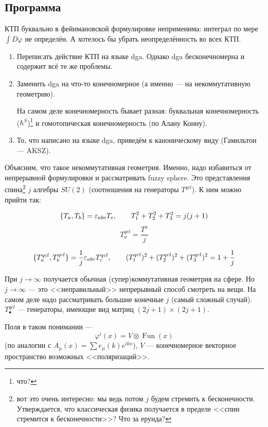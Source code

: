 \documentclass[11pt]{article}
\def\ph{\varphi}
\theoremstyle{remark}
\theoremstyle{definition}
\newcommand{\que}[1]{\footnote{\textcolor[rgb]{0.38,0.69,0.82}{#1}}}
\begin{document}
\subsection{Программа}

КТП буквально в фейнмановской формулировке неприменима: интеграл по мере $\int D\ph$ не определён. А хотелось бы убрать неопределённость во всех КТП.

\begin{enumerate}

\item Переписать действие КТП на языке dga. Однако dga бесконечномерна и содержит всё те же проблемы.
\item Заменить dga на что-то конечномерное (а именно --- на некоммутативную геометрию).

На самом деле конечномерность бывает разная: буквальная конечномерность ($\hbar^S$)\que{что?} и гомотопическая конечномерность (по Алану Конну).

\item То, что написано на языке dga, приведём к каноническому виду (Гамильтон --- AKSZ).

\end{enumerate}

Объясним, что такое некоммутативная геометрия. Именно, надо избавиться от непрерывной формулировки и рассматривать fuzzy sphere. Это представления спина\que{вот это очень интересно: мы ведь потом $j$ будем стремить к бесконечности. Утверждается, что классическая физика получается в пределе <<спин стремится к бесконечности>>? Что за ерунда?} $j$ алгебры $SU(2)$ (соотношения на генераторы $T^{qcl}$). К ним можно прийти так:

$$\{T_a, T_b\} = \varepsilon_{abc} T_c, \hskip 20 pt T_1^2 + T_2^2 + T_3^2 = j(j+1)$$
$$T_a^{qcl} = \frac{T^a}{j}$$

$$\{ T^{qcl}_a, T^{qcl}_b \} = \frac{1}{j} \varepsilon_{abc} T_c^{qcl}, \hskip 20 pt (T_1^{qcl})^2 + (T_2^{qcl})^2 + (T_3^{qcl})^2 = 1 + \frac{1}{j}$$

При $j \to \infty$ получается обычная (супер)коммутативная геометрия на сфере. Но $j \to \infty$ --- это <<неправильный>> непрерывный способ смотреть на вещи. На самом деле надо рассматривать большие конечные $j$ (самый сложный случай). $T^{qcl}_{\bullet}$ --- генераторы, имеющие вид матриц $(2j+1) \times (2j+1)$.

Поля в таком понимании --- $$\ph^i (x) = V \otimes \operatorname{Fun}(x)$$ (по аналогии с $A_{\mu} (x) = \sum e_{\mu} (k) e^{ikx}$), $V$ --- конечномерное векторное пространство возможных <<поляризаций>>.
\end{document}
